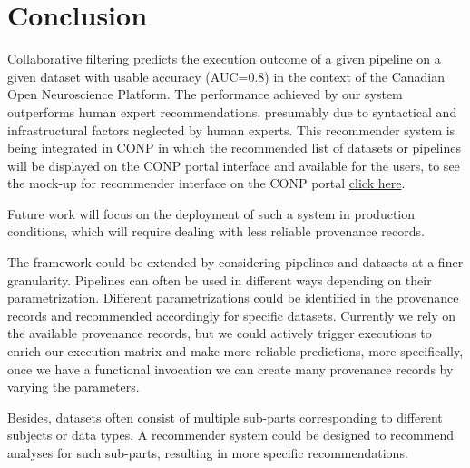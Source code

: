 \documentclass[conference]{IEEEtran}
\begin{document}
\section{Conclusion}

Collaborative filtering predicts the execution outcome of a given pipeline
on a given dataset with usable accuracy (AUC=0.8) in the context of the
Canadian Open Neuroscience Platform. The performance achieved by our system
outperforms
human expert recommendations, presumably due to syntactical and
infrastructural factors neglected by human experts. This recommender system is being integrated in CONP in which the recommended list of datasets or pipelines will be displayed on the CONP portal interface and available for the users, to see the mock-up for recommender interface on the CONP portal \href{https://github.com/mandana-mazaheri/Pipelines-datasets-recommender-paper/blob/master/result/mockup_for_recommender_on_portal.png}{ click here}. 

Future work will focus on the deployment of such a system in production conditions, which will require dealing with less reliable provenance records.

The framework could be extended by considering pipelines and datasets 
at a finer granularity. Pipelines can often be used in different ways 
depending on their parametrization. Different parametrizations could 
be identified in the provenance records and recommended accordingly 
for specific datasets.
Currently we rely on the available provenance records, but we could actively trigger executions to enrich our execution matrix and make more reliable predictions, more specifically, once we have a functional invocation we can create many provenance records by varying the parameters.


Besides, datasets often consist of multiple 
sub-parts corresponding to different subjects or data types. A recommender 
system could be designed to recommend analyses for such sub-parts, 
resulting in more specific recommendations.





\end{document}
